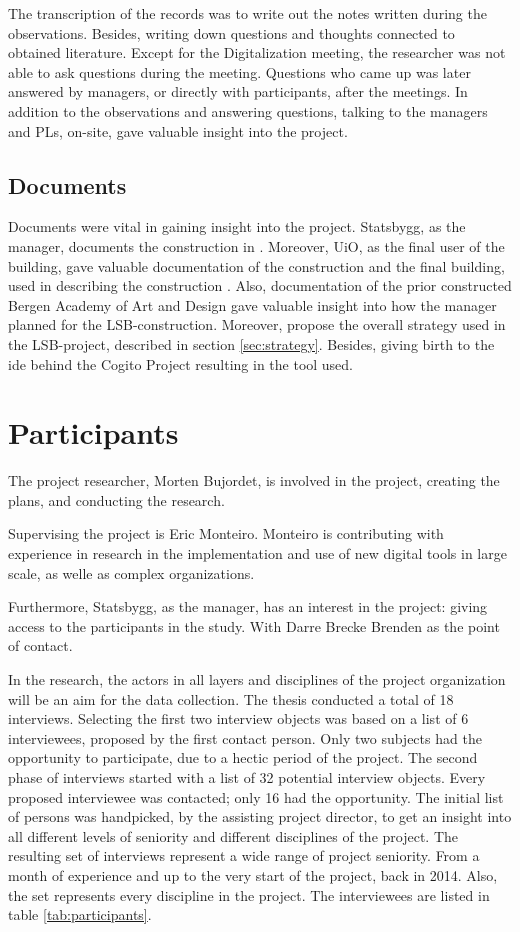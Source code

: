The transcription of the records was to write out the notes written during the observations. Besides, writing down questions and thoughts connected to obtained literature. Except for the Digitalization meeting, the researcher was not able to ask questions during the meeting. Questions who came up was later answered by managers, or directly with participants, after the meetings. In addition to the observations and answering questions, talking to the managers and PLs, on-site, gave valuable insight into the project.

\subsection{Documents}
Documents were vital in gaining insight into the project. Statsbygg, as the manager, documents the construction in \citep{statsbygg2019uio}. Moreover, UiO, as the final user of the building, gave valuable documentation of the construction and the final building, used in describing the construction \citep{uio2019science}. Also, documentation of the prior constructed Bergen Academy of Art and Design \citep{lean_i_praksis} gave valuable insight into how the manager planned for the LSB-construction. Moreover, propose the overall strategy used in the LSB-project, described in section \ref{sec:strategy}. Besides, giving birth to the ide behind the Cogito Project resulting in the tool used. 

\section{Participants}
The project researcher, Morten Bujordet, is involved in the project, creating the plans, and conducting the research.
	 
Supervising the project is Eric Monteiro. Monteiro is contributing with experience in research in the implementation and use of new digital tools in large scale, as welle as complex organizations. 

Furthermore, Statsbygg, as the manager, has an interest in the project: giving access to the participants in the study. With Darre Brecke Brenden as the point of contact.
	 
In the research, the actors in all layers and disciplines of the project organization will be an aim for the data collection. The thesis conducted a total of 18 interviews. Selecting the first two interview objects was based on a list of 6 interviewees, proposed by the first contact person. Only two subjects had the opportunity to participate, due to a hectic period of the project.  The second phase of interviews started with a list of 32 potential interview objects. Every proposed interviewee was contacted; only 16 had the opportunity. The initial list of persons was handpicked, by the assisting project director, to get an insight into all different levels of seniority and different disciplines of the project. The resulting set of interviews represent a wide range of project seniority. From a month of experience and up to the very start of the project, back in 2014. Also, the set represents every discipline in the project. The interviewees are listed in table \ref{tab:participants}.

